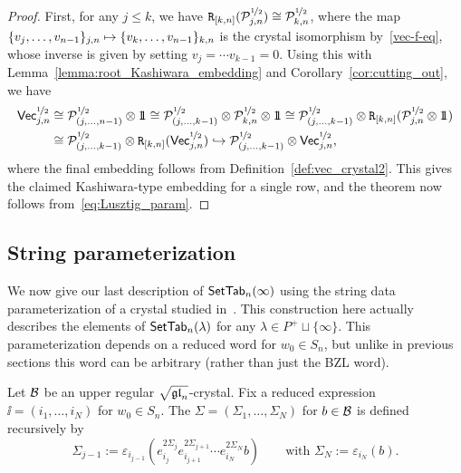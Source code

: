 \documentclass[11pt]{article}
\begin{document}
\begin{proof}
First, for any $j \leq k$, we have $\restrictF{[k,n]}(\sqrtE_{j,n}) \iso \sqrtE_{k,n}$, where the map $\uj{j,n}{v_j, \dotsc, v_{n-1}} \mapsto \uj{k,n}{v_k, \dotsc, v_{n-1}}$ is the crystal isomorphism by~\eqref{vec-f-eq},
whose inverse is given by setting $v_j = \cdots v_{k-1} = 0$.
Using this with Lemma~\ref{lemma:root_Kashiwara_embedding} and Corollary~\ref{cor:cutting_out}, we have
\begin{align*}
\VCrysR{j} & \iso \sqrtE_{(j, \dotsc, n-1)} \otimes \one \iso \sqrtE_{(j, \dotsc, k-1)} \otimes \sqrtE_{k,n} \otimes \one \iso \sqrtE_{(j,\dotsc,k-1)} \otimes \restrictF{[k,n]}(\sqrtE_{j,n} \otimes \one)
\\ &
\iso \sqrtE_{(j,\dotsc,k-1)} \otimes \restrictF{[k,n]}(\VCrysR{j}) \hookrightarrow \sqrtE_{(j,\dotsc,k-1)} \otimes \VCrysR{j},
\end{align*}
where the final embedding follows from Definition~\ref{def:vec_crystal2}.
This gives the claimed Kashiwara-type embedding for a single row, and the theorem now follows from~\eqref{eq:Lusztig_param}.
\end{proof}




\subsection{String parameterization}

We now give our last description of $\SetTab_n(\infty)$ using the string data parameterization of a crystal studied in~\cite{BZ93,BZ01,Kashiwara93,Littelmann98}.
This construction here actually describes the elements of $\SetTab_n(\lambda)$ for any $\lambda \in P^+\sqcup\{\infty\}$.
This parameterization depends on a reduced word for $w_0 \in S_n$, but 
unlike in previous sections this word can be arbitrary (rather than just the BZL word).

\begin{definition}
\label{string-data-def}
Let $\cB$ be an upper regular $\sqgln$-crystal.
Fix a reduced expression $\ii = (i_1, \dotsc, i_N)$ for $w_0 \in S_n$.
The  $\Sigma = (\Sigma_1, \dotsc, \Sigma_N)$ for $b \in \cB$ is defined recursively by
\[
\Sigma_{j-1}:= \varepsilon_{i_{j-1}}(e_{i_j}^{2\Sigma_j} e_{i_{j+1}}^{2\Sigma_{j+1}} \cdots e_{i_N}^{2\Sigma_N} b)
\qquad\text{with }\Sigma_N := \varepsilon_{i_N}(b).
\]
\end{definition}
\end{document}
